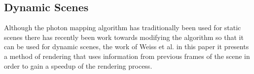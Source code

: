 \subsection{Dynamic Scenes}
Although the photon mapping algorithm has traditionally been used for static scenes there has
recently been work towards modifying the algorithm so that it can be used for dynamic scenes, the
work of Weiss et al. \cite{Weiss12} in this paper it presents a method of rendering that uses
information from previous frames of the scene in order to gain a speedup of the rendering process.
